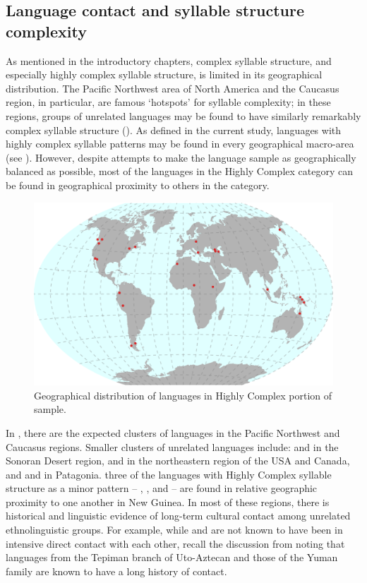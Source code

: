 \subsection{Language contact and syllable structure complexity}\label{sec:8.4.5}

  As mentioned in the introductory chapters, complex syllable structure, and especially highly complex syllable structure, is limited in its geographical distribution. The Pacific Northwest area of North America and the Caucasus region, in particular, are famous ‘hotspots’ for syllable complexity; in these regions, groups of unrelated languages may be found to have similarly remarkably complex syllable structure (\citealt{Chirikba2008,ThompsonKinkade1990}). As defined in the current study, languages with highly complex syllable patterns may be found in every geographical macro-area (see ). However, despite attempts to make the language sample as geographically balanced as possible, most of the languages in the Highly Complex category can be found in geographical proximity to others in the category.

  
\begin{figure}
\includegraphics[width=\textwidth]{figures/fig81.png}
\caption{\label{fig:8.1}Geographical distribution of languages in Highly Complex portion of sample.}
\end{figure}

  In , there are the expected clusters of languages in the Pacific Northwest and Caucasus regions. Smaller clusters of unrelated languages include:  and  in the Sonoran Desert region,  and  in the northeastern region of the USA and Canada, and  and  in Patagonia.  three of the languages with Highly Complex syllable structure as a minor pattern -- , , and  -- are found in relative geographic proximity to one another in New Guinea. In most of these regions, there is historical and linguistic evidence of long-term cultural contact among unrelated ethnolinguistic groups. For example, while  and  are not known to have been in intensive direct contact with each other, recall the discussion from  noting that languages from the Tepiman branch of Uto-Aztecan and those of the Yuman family are known to have a long history of contact. 

